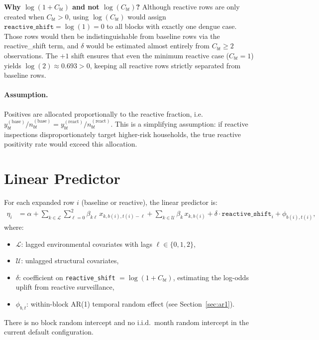 \documentclass[12pt,a4paper]{article}
\begin{document}
\noindent\textbf{Why $\log(1 + C_{bt})$ and not $\log(C_{bt})$?} Although reactive rows are only created when $C_{bt} > 0$, using $\log(C_{bt})$ would assign $\texttt{reactive\_shift} = \log(1) = 0$ to all blocks with exactly one dengue case. Those rows would then be indistinguishable from baseline rows via the reactive\_shift term, and $\delta$ would be estimated almost entirely from $C_{bt} \geq 2$ observations. The $+1$ shift ensures that even the minimum reactive case ($C_{bt} = 1$) yields $\log(2) \approx 0.693 > 0$, keeping all reactive rows strictly separated from baseline rows.

\paragraph{Assumption.} Positives are allocated proportionally to the reactive fraction, i.e.\ $y_{bt}^{(\text{base})}/n_{bt}^{(\text{base})} = y_{bt}^{(\text{react})}/n_{bt}^{(\text{react})}$. This is a simplifying assumption: if reactive inspections disproportionately target higher-risk households, the true reactive positivity rate would exceed this allocation.

\section{Linear Predictor}

For each expanded row $i$ (baseline or reactive), the linear predictor is:
\begin{align}
\eta_i &= \alpha
  + \sum_{k \in \mathcal{L}} \sum_{\ell=0}^{2} \beta_{k\ell}\, x_{k,b(i),t(i)-\ell}
  + \sum_{k \in \mathcal{U}} \beta_k\, x_{k,b(i)}
  + \delta \cdot \texttt{reactive\_shift}_i
  + \phi_{b(i),t(i)},
\end{align}
where:
\begin{itemize}
  \item $\mathcal{L}$: lagged environmental covariates with lags $\ell \in \{0,1,2\}$,
  \item $\mathcal{U}$: unlagged structural covariates,
  \item $\delta$: coefficient on \texttt{reactive\_shift} $= \log(1 + C_{bt})$, estimating the log-odds uplift from reactive surveillance,
  \item $\phi_{b,t}$: within-block AR(1) temporal random effect (see Section~\ref{sec:ar1}).
\end{itemize}

There is no block random intercept and no i.i.d.\ month random intercept in the current default configuration.
\end{document}
